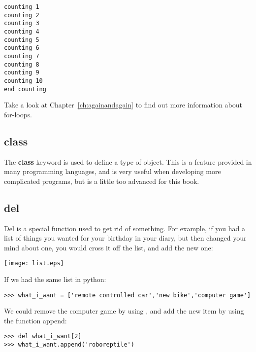 \begin{listing}
\begin{verbatim}
counting 1
counting 2
counting 3
counting 4
counting 5
counting 6
counting 7
counting 8
counting 9
counting 10
end counting
\end{verbatim}
\end{listing}

\noindent
Take a look at Chapter~\ref{ch:againandagain} to find out more information about for-loops.

\subsection*{class}

The \textbf{class} keyword is used to define a type of object. This is a feature provided in many programming languages, and is very useful when developing more complicated programs, but is a little too advanced for this book.

\subsection*{del}

Del is a special function used to get rid of something. For example, if you had a list of things you wanted for your birthday in your diary, but then changed your mind about one, you would cross it off the list, and add the new one:

\begin{center}
\texttt{[image: list.eps]}
\end{center}

\noindent
If we had the same list in python:

\begin{listing}
\begin{verbatim}
>>> what_i_want = ['remote controlled car','new bike','computer game']
\end{verbatim}
\end{listing}

\noindent
We could remove the computer game by using , and add the new item by using the function append:

\begin{listing}
\begin{verbatim}
>>> del what_i_want[2]
>>> what_i_want.append('roboreptile')
\end{verbatim}
\end{listing}

